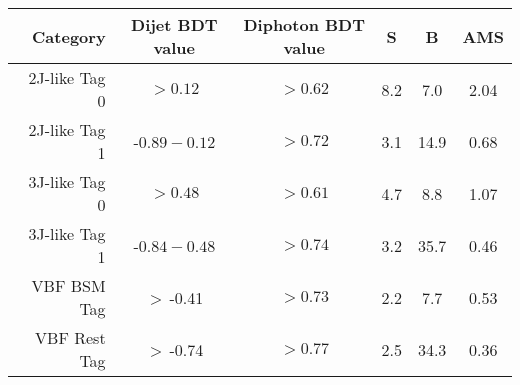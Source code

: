 \begin{tabular}{ r | c | c | c | c | c } 
\hline 
Category       & Dijet BDT value & Diphoton BDT value & S & B & AMS \\ 
\hline 
2J-like  Tag 0 & $ > 0.12$         & $ > 0.62$             & 8.2    & 7.0        & 2.04         \\
2J-like  Tag 1 & -$0.89 - 0.12$    & $ > 0.72$             & 3.1    & 14.9       & 0.68         \\
3J-like  Tag 0 & $ > 0.48$         & $ > 0.61$             & 4.7    & 8.8        & 1.07         \\
3J-like  Tag 1 & -$0.84 - 0.48$    & $ > 0.74$             & 3.2    & 35.7       & 0.46         \\
VBF BSM  Tag   & $ >\,$-0.41        & $ > 0.73$             & 2.2    & 7.7        & 0.53         \\
VBF Rest Tag   & $ >\,$-0.74        & $ > 0.77$             & 2.5    & 34.3       & 0.36         \\
\hline 
\end{tabular}
